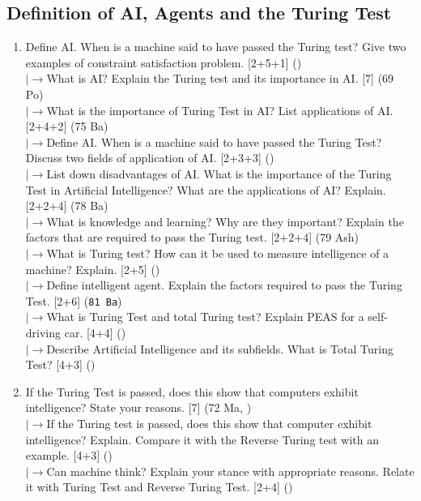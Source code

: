 \documentclass[12pt]{article}
\newcommand{\lb}{\\$\left|\rightarrow\right.$}
\begin{document}
  \subsection{Definition of AI, Agents and the Turing Test}
    \begin{enumerate}[topsep=0pt, noitemsep]
      \item Define AI. When is a machine said to have passed the Turing test? Give two examples of constraint satisfaction problem. \hfill [2+5+1] ()
        \lb What is AI? Explain the Turing test and its importance in AI. \hfill [7] (69 Po)
        \lb What is the importance of Turing Test in AI? List applications of AI. \hfill [2+4+2] (75 Ba)
        \lb Define AI. When is a machine said to have passed the Turing Test? Discuss two fields of application of AI. \hfill [2+3+3] ()
        \lb List down disadvantages of AI. What is the importance of the Turing Test in Artificial Intelligence? What are the applications of AI? Explain. \hfill [2+2+4] (78 Ba)
        \lb What is knowledge and learning? Why are they important? Explain the factors that are required to pass the Turing test. \hfill [2+2+4] (79 Ash)
        \lb What is Turing test? How can it be used to measure intelligence of a machine? Explain. \hfill [2+5] ()
        \lb Define intelligent agent. Explain the factors required to pass the Turing Test. \hfill [2+6] (\texttt{81 Ba})
        \lb What is Turing Test and total Turing test? Explain PEAS for a self-driving car. \hfill [4+4] ()
        \lb Describe Artificial Intelligence and its subfields. What is Total Turing Test? \hfill [4+3] ()

      \item If the Turing Test is passed, does this show that computers exhibit intelligence? State your reasons. \hfill [7] (72 Ma, )
        \lb If the Turing test is passed, does this show that computer exhibit intelligence? Explain. Compare it with the Reverse Turing test with an example. \hfill [4+3] ()
        \lb Can machine think? Explain your stance with appropriate reasons. Relate it with Turing Test and Reverse Turing Test. \hfill [2+4] ()


\end{enumerate}
\end{document}
